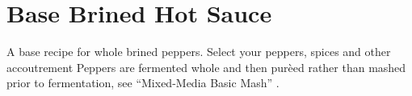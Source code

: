 \section[Brined Hot Sauce]{Base Brined Hot Sauce}
\label{base_lacto_brine_hotsauce}

\begin{recipestats}[
	servings=12 \fluidounce,
	preptime=60 minutes,
	bakingtime=2 weeks,
	source=\citefield{fieryferments2017}{title} \cite{fieryferments2017}; \textit{Pickl-It},
	]
\end{recipestats}

\begin{recipeabstract}
	A base recipe for whole brined peppers.
	Select your peppers, spices and other accoutrement
	Peppers are fermented whole and then pur\`{e}ed rather than mashed prior to fermentation, see ``Mixed-Media Basic Mash'' \cite{fieryferments2017}.
\end{recipeabstract}

\begin{ingredientcolumns}[1]
	\begin{ingredientblock}
		\\
		\\
		\\
		\\
		\\
		\\
		\\
		\\
	\end{ingredientblock}
\end{ingredientcolumns}

